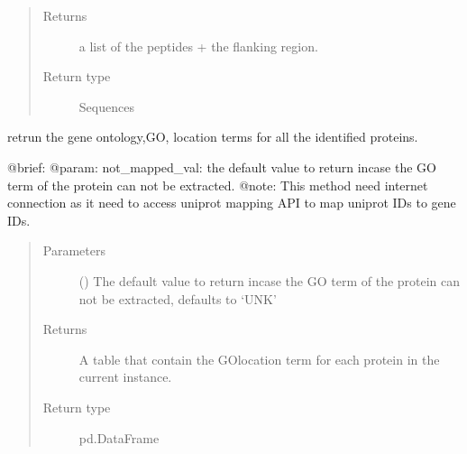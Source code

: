 \documentclass[letterpaper,10pt,english]{sphinxmanual}
\begin{document}
\begin{fulllineitems}
\begin{fulllineitems}
\begin{quote}
\begin{description}
\item[{Returns}] \leavevmode
a list of the peptides + the flanking region.

\item[{Return type}] \leavevmode
Sequences

\end{description}\end{quote}

\end{fulllineitems}


\begin{fulllineitems}
\label{\detokenize{IPTK.Classes:IPTK.Classes.Experiment.Experiment.get_go_location_id_parent_proteins}}
retrun the gene ontology,GO, location terms for all the identified proteins.

@brief: 
@param: not\_mapped\_val: the default value to return incase the GO term of the protein can not be extracted. 
@note: This method need internet connection as it need to access uniprot mapping API to map uniprot IDs to gene IDs.
\begin{quote}\begin{description}
\item[{Parameters}] \leavevmode
{} (\sphinxstyleliteralemphasis{\sphinxupquote{, }}) \textendash{} The default value to return incase the GO term of the protein can not be extracted, defaults to ‘UNK’

\item[{Returns}] \leavevmode
A table that contain the GO\sphinxhyphen{}location term for each protein in the current instance.

\item[{Return type}] \leavevmode
pd.DataFrame

\end{description}\end{quote}


\end{fulllineitems}
\end{fulllineitems}
\end{document}
